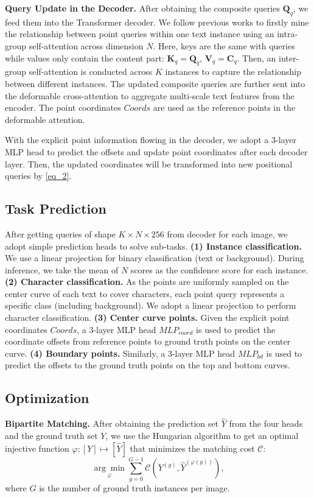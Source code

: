 \documentclass[10pt,twocolumn,letterpaper]{article}
\begin{document}
\noindent \textbf{Query Update in the Decoder.} After obtaining the composite queries $\textbf{Q}_q$, we feed them into the Transformer decoder. We follow previous works \cite{dong2021visual,zhang2022text,ye2022dptext} to firstly mine the relationship between point queries within one text instance using an intra-group self-attention across dimension $N$. Here, keys are the same with queries while values only contain the content part: $\textbf{K}_q = \textbf{Q}_q$, $\textbf{V}_q = \textbf{C}_q$. Then, an inter-group self-attention is conducted across $K$ instances to capture the relationship between different instances. The updated composite queries are further sent into the deformable cross-attention to aggregate multi-scale text features from the encoder. The point coordinates $Coords$ are used as the reference points in the deformable attention. 

With the explicit point information flowing in the decoder, we adopt a 3-layer MLP head to predict the offsets and update point coordinates after each decoder layer. Then, the updated coordinates will be transformed into new positional queries by \cref{eq_2}.

\subsection{Task Prediction}
After getting queries of shape $K \times N \times 256$ from decoder for each image, we adopt simple prediction heads to solve sub-tasks. \textbf{(1) Instance classification.} We use a linear projection for binary classification (text or background). During inference, we take the mean of $N$ scores as the confidence score for each instance.
\textbf{(2) Character classification.} As the points are uniformly sampled on the center curve of each text to cover characters, each point query represents a specific class (including background). We adopt a linear projection to perform character classification.
\textbf{(3) Center curve points.} Given the explicit point coordinates $Coords$, a 3-layer MLP head $MLP_{coord}$ is used to predict the coordinate offsets from reference points to ground truth points on the center curve.
\textbf{(4) Boundary points.} Similarly, a 3-layer MLP head $MLP_{bd}$ is used to predict the offsets to the ground truth points on the top and bottom curves. 

\subsection{Optimization}
\noindent \textbf{Bipartite Matching.} After obtaining the prediction set $\hat{Y}$ from the four heads and the ground truth set $Y$, we use the Hungarian algorithm \cite{kuhn1955hungarian} to get an optimal injective function $\varphi: [Y] \mapsto [\hat{Y}]$ that minimizes the matching cost $\mathcal{C}$:
\begin{equation}
    \underset{\varphi}{\arg \min} \sum\limits^{G-1}_{g=0}{\mathcal{C}(Y^{(g)}, \hat{Y}^{(\varphi(g))})}, \label{eq_4}
\end{equation}
where $G$ is the number of ground truth instances per image. 
\end{document}
